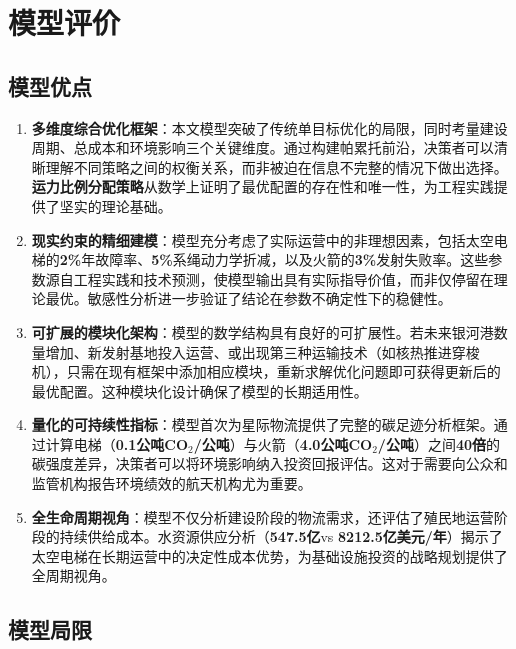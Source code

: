 \section{模型评价}

\subsection{模型优点}

\begin{enumerate}
    \item \textbf{多维度综合优化框架}：本文模型突破了传统单目标优化的局限，同时考量建设周期、总成本和环境影响三个关键维度。通过构建帕累托前沿，决策者可以清晰理解不同策略之间的权衡关系，而非被迫在信息不完整的情况下做出选择。\textbf{运力比例分配策略}从数学上证明了最优配置的存在性和唯一性，为工程实践提供了坚实的理论基础。
    
    \item \textbf{现实约束的精细建模}：模型充分考虑了实际运营中的非理想因素，包括太空电梯的\textbf{2\%}年故障率、\textbf{5\%}系绳动力学折减，以及火箭的\textbf{3\%}发射失败率。这些参数源自工程实践和技术预测，使模型输出具有实际指导价值，而非仅停留在理论最优。敏感性分析进一步验证了结论在参数不确定性下的稳健性。
    
    \item \textbf{可扩展的模块化架构}：模型的数学结构具有良好的可扩展性。若未来银河港数量增加、新发射基地投入运营、或出现第三种运输技术（如核热推进穿梭机），只需在现有框架中添加相应模块，重新求解优化问题即可获得更新后的最优配置。这种模块化设计确保了模型的长期适用性。
    
    \item \textbf{量化的可持续性指标}：模型首次为星际物流提供了完整的碳足迹分析框架。通过计算电梯（\textbf{0.1公吨CO$_2$/公吨}）与火箭（\textbf{4.0公吨CO$_2$/公吨}）之间\textbf{40倍}的碳强度差异，决策者可以将环境影响纳入投资回报评估。这对于需要向公众和监管机构报告环境绩效的航天机构尤为重要。
    
    \item \textbf{全生命周期视角}：模型不仅分析建设阶段的物流需求，还评估了殖民地运营阶段的持续供给成本。水资源供应分析（\textbf{547.5亿}vs \textbf{8212.5亿美元/年}）揭示了太空电梯在长期运营中的决定性成本优势，为基础设施投资的战略规划提供了全周期视角。
\end{enumerate}

\subsection{模型局限}

